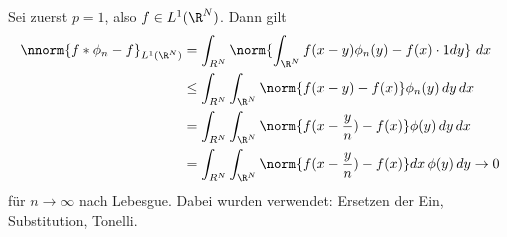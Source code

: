 \begin{beweis}
  Sei zuerst $p = 1$, also $f \in L^{1}(\R^{N})$. Dann gilt
  \begin{align*}
    \nnorm{f*\phi_{n} - f}_{L^{1}(\R^{N})} &=  \int_{R^{N}} \norm{ \int_{\R^{N}} f(x - y)\phi_{n}(y) - f(x) \cdot 1 dy}\,   \,dx\\
 &\leq  \int_{R^{N}}  \int_{\R^{N}} \norm{f(x - y) - f(x)}\phi_{n}(y)\,  dy \,dx\\
 &=  \int_{R^{N}}  \int_{\R^{N}} \norm{f(x - \frac y n) - f(x)}\phi(y)\,  dy \,dx\\
 &=  \int_{R^{N}}  \int_{\R^{N}} \norm{f(x - \frac y n) - f(x)} dx \,\phi(y)\,  dy \to 0
  \end{align*}
für $n \to \infty$ nach Lebesgue. Dabei wurden verwendet: Ersetzen der Ein, Substitution, Tonelli.  
\end{beweis}


